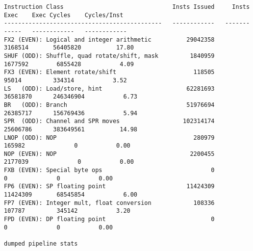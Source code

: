 \begin{verbatim}
Instruction Class                               Insts Issued     Insts Exec    Exec Cycles    Cycles/Inst
---------------------------------------------   ------------   ------------   ------------   ------------
FX2 (EVEN): Logical and integer arithmetic          29042358      3168514       56405820          17.80
SHUF (ODD): Shuffle, quad rotate/shift, mask         1840959      1677592        6855428           4.09
FX3 (EVEN): Element rotate/shift                      118505        95014         334314           3.52
LS   (ODD): Load/store, hint                        62281693     36581870      246346904           6.73
BR   (ODD): Branch                                  51976694     26385717      156769436           5.94
SPR  (ODD): Channel and SPR moves                  102314174     25606786      383649561          14.98
LNOP (ODD): NOP                                       280979       165982              0           0.00
NOP (EVEN): NOP                                      2200455      2177039              0           0.00
FXB (EVEN): Special byte ops                               0            0              0           0.00
FP6 (EVEN): SP floating point                       11424309     11424309       68545854           6.00
FP7 (EVEN): Integer mult, float conversion            108336       107787         345142           3.20
FPD (EVEN): DP floating point                              0            0              0           0.00

dumped pipeline stats
\end{verbatim}
